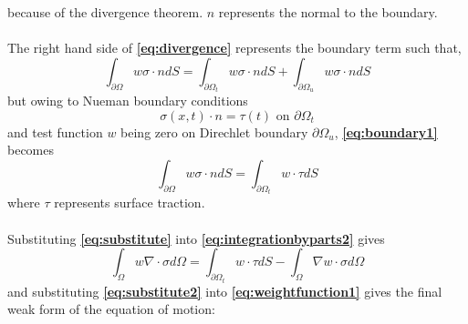 because of the divergence theorem. $n$ represents the normal to the boundary.\\\\The right hand side of {\bfseries \ref{eq:divergence}} represents the boundary term such that,
\begin{equation}
\int_{\partial\Omega} w \sigma \cdot n dS = \int_{\partial\Omega_t} w\sigma\cdot n dS + \int_{\partial\Omega_u} w\sigma\cdot n dS
\label{eq:boundary1}
\end{equation}
but owing to Nueman boundary conditions
\begin{equation}
\sigma(x,t)\cdot n = \tau(t) \text{ on } \partial\Omega_t
\label{eq:neumen}
\end{equation}
and test function $w$ being zero on Direchlet boundary $\partial\Omega_u$, {\bfseries \ref{eq:boundary1}} becomes
\begin{equation}
\int_{\partial\Omega} w \sigma \cdot n dS = \int_{\partial\Omega_t} w\cdot\tau  dS
\label{eq:substitute}
\end{equation}
where $\tau$ represents surface traction.\\\\
Substituting {\bfseries \ref{eq:substitute}} into {\bfseries \ref{eq:integrationbyparts2}} gives
\begin{equation}
\int_\Omega w\nabla\cdot\sigma d\Omega= \int_{\partial\Omega_t} w\cdot\tau dS - \int_\Omega \nabla w\cdot\sigma d\Omega
\label{eq:substitute2}
\end{equation}
and substituting  {\bfseries \ref{eq:substitute2}} into {\bfseries \ref{eq:weightfunction1}} gives the final weak form of the equation of motion:

